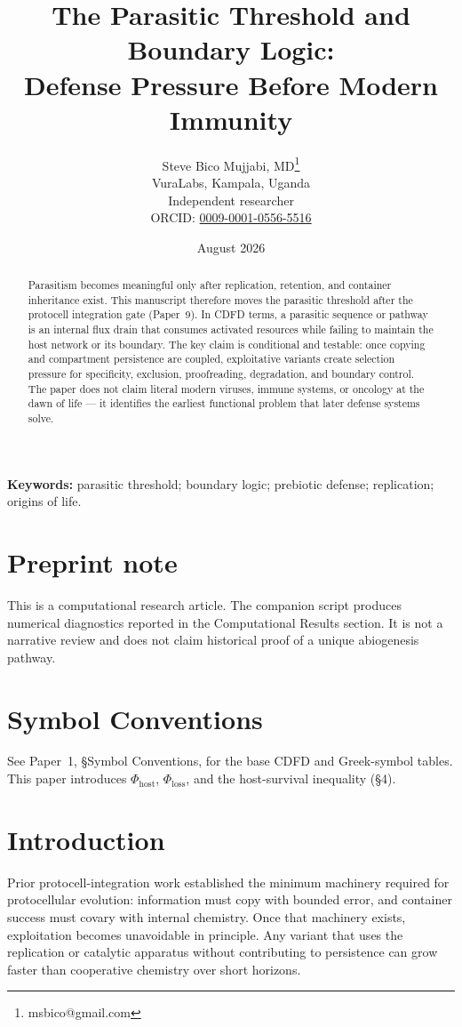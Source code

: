\documentclass[11pt,a4paper]{article}
\title{The Parasitic Threshold and Boundary Logic:\\ Defense Pressure Before Modern Immunity}
\author{Steve Bico Mujjabi, MD\thanks{msbico@gmail.com}\\
VuraLabs, Kampala, Uganda\\
Independent researcher\\
ORCID: \href{https://orcid.org/0009-0001-0556-5516}{0009-0001-0556-5516}}
\date{August 2026}
\begin{document}
\maketitle

\begin{abstract}
Parasitism becomes meaningful only after replication, retention, and container inheritance exist. This manuscript therefore moves the parasitic threshold after the protocell integration gate (Paper~9). In CDFD terms, a parasitic sequence or pathway is an internal flux drain that consumes activated resources while failing to maintain the host network or its boundary. The key claim is conditional and testable: once copying and compartment persistence are coupled, exploitative variants create selection pressure for specificity, exclusion, proofreading, degradation, and boundary control. The paper does not claim literal modern viruses, immune systems, or oncology at the dawn of life --- it identifies the earliest functional problem that later defense systems solve.
\end{abstract}

\noindent\textbf{Keywords:} parasitic threshold; boundary logic; prebiotic defense; replication; origins of life.

\section*{Preprint note}
This is a computational research article. The companion script produces numerical diagnostics reported in the Computational Results section. It is not a narrative review and does not claim historical proof of a unique abiogenesis pathway.

\section*{Symbol Conventions}

\noindent See Paper~1, \S Symbol Conventions, for the base CDFD and Greek-symbol tables. This paper introduces $\Phi_{\mathrm{host}}$, $\Phi_{\mathrm{loss}}$, and the host-survival inequality (\S4).

\section{Introduction}
Prior protocell-integration work established the minimum machinery required for protocellular evolution: information must copy with bounded error, and container success must covary with internal chemistry. Once that machinery exists, exploitation becomes unavoidable in principle. Any variant that uses the replication or catalytic apparatus without contributing to persistence can grow faster than cooperative chemistry over short horizons.
\end{document}
